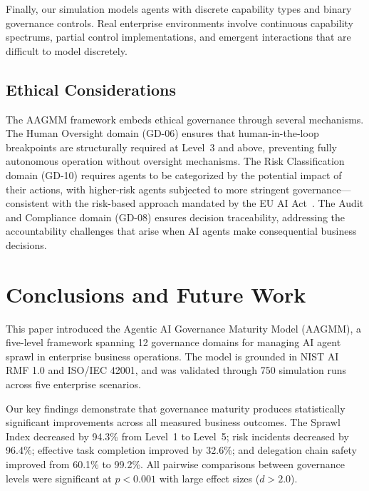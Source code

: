 \documentclass[ai,article,submit,pdftex,moreauthors]{Definitions/mdpi}
\begin{document}
Finally, our simulation models agents with discrete capability types and binary governance controls. Real enterprise environments involve continuous capability spectrums, partial control implementations, and emergent interactions that are difficult to model discretely.

\subsection{Ethical Considerations}\label{sec:disc-ethics}

The AAGMM framework embeds ethical governance through several mechanisms. The Human Oversight domain (GD-06) ensures that human-in-the-loop breakpoints are structurally required at Level~3 and above, preventing fully autonomous operation without oversight mechanisms. The Risk Classification domain (GD-10) requires agents to be categorized by the potential impact of their actions, with higher-risk agents subjected to more stringent governance---consistent with the risk-based approach mandated by the EU AI Act~\cite{euaiact2024}. The Audit and Compliance domain (GD-08) ensures decision traceability, addressing the accountability challenges that arise when AI agents make consequential business decisions.


\section{Conclusions and Future Work}\label{sec:conclusion}

This paper introduced the Agentic AI Governance Maturity Model (AAGMM), a five-level framework spanning 12 governance domains for managing AI agent sprawl in enterprise business operations. The model is grounded in NIST AI RMF 1.0 and ISO/IEC 42001, and was validated through 750 simulation runs across five enterprise scenarios.

Our key findings demonstrate that governance maturity produces statistically significant improvements across all measured business outcomes. The Sprawl Index decreased by 94.3\% from Level~1 to Level~5; risk incidents decreased by 96.4\%; effective task completion improved by 32.6\%; and delegation chain safety improved from 60.1\% to 99.2\%. All pairwise comparisons between governance levels were significant at $p < 0.001$ with large effect sizes ($d > 2.0$).
\end{document}
